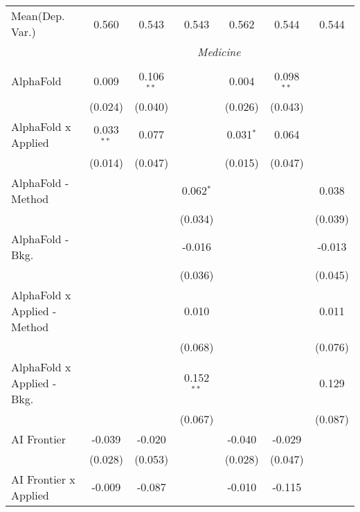 \begin{tabular}{lcccccc}
Mean(Dep. Var.) & 0.560 & 0.543 & 0.543 & 0.562 & 0.544 & 0.544 \\
 & \multicolumn{6}{c}{\textit{Medicine}} \\ \\
   AlphaFold                      & 0.009        & 0.106$^{**}$  &               & 0.004       & 0.098$^{**}$ &   \\   
                                  & (0.024)      & (0.040)       &               & (0.026)     & (0.043)      &   \\   
   AlphaFold x Applied            & 0.033$^{**}$ & 0.077         &               & 0.031$^{*}$ & 0.064        &   \\   
                                  & (0.014)      & (0.047)       &               & (0.015)     & (0.047)      &   \\   
   AlphaFold - Method             &              &               & 0.062$^{*}$   &             &              & 0.038\\   
                                  &              &               & (0.034)       &             &              & (0.039)\\   
   AlphaFold - Bkg.               &              &               & -0.016        &             &              & -0.013\\   
                                  &              &               & (0.036)       &             &              & (0.045)\\   
   AlphaFold x Applied - Method   &              &               & 0.010         &             &              & 0.011\\   
                                  &              &               & (0.068)       &             &              & (0.076)\\   
   AlphaFold x Applied - Bkg.     &              &               & 0.152$^{**}$  &             &              & 0.129\\   
                                  &              &               & (0.067)       &             &              & (0.087)\\   
   AI Frontier                    & -0.039       & -0.020        &               & -0.040      & -0.029       &   \\   
                                  & (0.028)      & (0.053)       &               & (0.028)     & (0.047)      &   \\   
   AI Frontier x Applied          & -0.009       & -0.087        &               & -0.010      & -0.115       &   \\   

\end{tabular}
